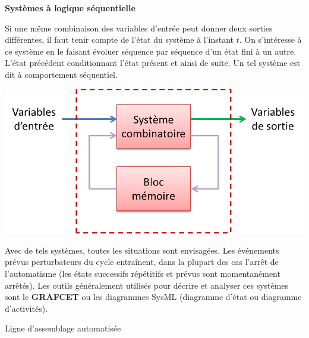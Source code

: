 \documentclass[10pt,fleqn]{article} %
\begin{document}
\begin{defi} \textbf{Systèmes à logique séquentielle}

\begin{minipage}[c]{0.55\linewidth}
Si une même combinaison des variables d'entrée peut donner deux sorties
différentes, il faut tenir compte de l'état du système à l'instant $t$. On
s'intéresse à ce système en le faisant évoluer séquence par séquence d'un état
fini à un autre. L'état précédent conditionnant l'état présent et ainsi de
suite. Un tel système est dit à comportement séquentiel. 
\end{minipage} \hfill
\begin{minipage}[c]{0.4\linewidth}
 \begin{center}
    \includegraphics[width=\textwidth]{images/seq}
  \end{center}
\end{minipage}

\end{defi} 

Avec de tels systèmes, toutes les situations sont envisagées. Les événements
prévus perturbateurs du cycle entraînent, dans la plupart des cas l'arrêt de
l'automatisme (les états successifs répétitifs et prévus sont momentanément
arrêtés). Les outils généralement utilisés pour décrire et analyser ces
systèmes sont le \textbf{GRAFCET} ou les diagrammes SysML (diagramme d'état ou diagramme d'activités).

\begin{exemple}
 Ligne d'assemblage automatisée
\end{exemple}
\end{document}
